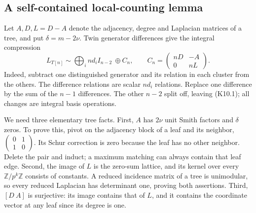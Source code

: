 \documentclass[11pt,a4paper]{article}
\theoremstyle{definition}\newtheorem{definition}[theorem]{Definition}
\theoremstyle{remark}\newtheorem{remark}[theorem]{Remark}
\newcommand{\Z}{\mathbb Z}\newcommand{\Q}{\mathbb Q}\newcommand{\F}{\mathbb F}
\numberwithin{equation}{section}
\begin{document}
\subsection{A self-contained local-counting lemma}\label{K10-sec-2}
Let $A,D,L=D-A$ denote the adjacency, degree and Laplacian matrices of a tree, and put $\delta=m-2\nu$. Twin generator differences give the integral compression
\[
 L_{T[n]}\sim\bigoplus_i nd_iI_{n-2}\ \oplus C_n,
 \qquad C_n=\begin{pmatrix}nD&-A\\0&nL\end{pmatrix}.         \tag{K10.1}
\]
Indeed, subtract one distinguished generator and its relation in each cluster from the others. The difference relations are scalar $nd_i$ relations. Replace one difference by the sum of the $n-1$ differences. The other $n-2$ split off, leaving (K10.1); all changes are integral basis operations.

We need three elementary tree facts. First, $A$ has $2\nu$ unit Smith factors and $\delta$ zeros. To prove this, pivot on the adjacency block of a leaf and its neighbor, $\left(\begin{smallmatrix}0&1\\1&0\end{smallmatrix}\right)$. Its Schur correction is zero because the leaf has no other neighbor. Delete the pair and induct; a maximum matching can always contain that leaf edge. Second, the image of $L$ is the zero-sum lattice, and its kernel over every $\Z/p^k\Z$ consists of constants. A reduced incidence matrix of a tree is unimodular, so every reduced Laplacian has determinant one, proving both assertions. Third, $[D\ A]$ is surjective: its image contains that of $L$, and it contains the coordinate vector at any leaf since its degree is one.
\end{document}
